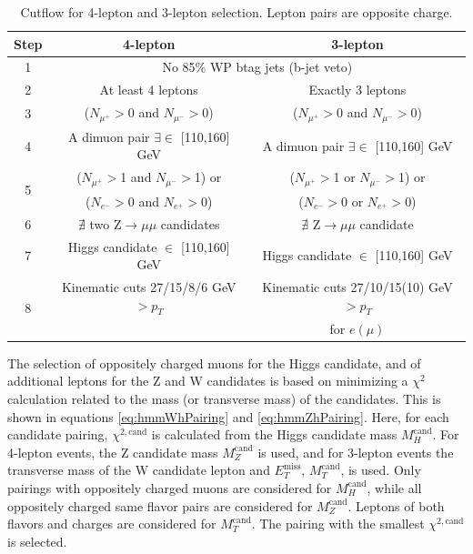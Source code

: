 \begin{table}[ht!]
 \begin{center}
\begin{tabular}{c c  c}\toprule
Step & 4-lepton & 3-lepton \\\midrule
1 & \multicolumn{2}{c}{No 85\% WP btag jets (b-jet veto)}           \\\midrule
2 & At least 4 leptons                                & Exactly 3 leptons\\\midrule
3 & ($N_{\mu^+}>$0 and $N_{\mu^-}>$0)                 & ($N_{\mu^+}>$0 and $N_{\mu^-}>$0) \\\midrule
4 & A dimuon pair $\exists\in$ [110,160] GeV                    & A dimuon pair $\exists\in$ [110,160] GeV \\\midrule
\multirow{2}{*}{5} & ($N_{\mu^+}>$1 and $N_{\mu^-}>$1) or              & ($N_{\mu^+}>$1 or $N_{\mu^-}>$1) or \\
  & ($N_{e^-}>$0 and $N_{e^+}>$0)                    & ($N_{e^-}>$0 or $N_{e^+}>$0)  \\\midrule
6 & $\nexists$ two Z$\to\mu\mu$ candidates                        & $\nexists$ Z$\to\mu\mu$ candidate  \\\midrule
7 & Higgs candidate $\in$ [110,160] GeV                  & Higgs candidate $\in$ [110,160] GeV \\\midrule
\multirow{2}{*}{8} & Kinematic cuts 27/15/8/6 GeV $>p_T$                    & Kinematic cuts 27/10/15(10) GeV $>p_T$ \\
  &                                                        & for $e(\mu)$ \\
\bottomrule\end{tabular}
 \end{center}
 \caption{Cutflow for 4-lepton and 3-lepton selection. Lepton pairs are opposite charge.}
\label{tab:hmmEv}
\end{table}

The selection of oppositely charged muons for the Higgs candidate, and of additional leptons for the Z and W candidates is based on minimizing a $\chi^2$ calculation related to the mass (or transverse mass) of the candidates. This is shown in equations \ref{eq:hmmWhPairing} and \ref{eq:hmmZhPairing}. Here, for each candidate pairing, $\chi^{2,\text{cand}}$ is calculated from the Higgs candidate mass $M_H^\text{cand}$. For 4-lepton events, the Z candidate mass $M_Z^\text{cand}$ is used, and for 3-lepton events the transverse mass of the W candidate lepton and $E_T^\text{miss}$, $M_T^\text{cand}$, is used. Only pairings with oppositely charged muons are considered for $M_H^\text{cand}$, while all oppositely charged same flavor pairs are considered for $M_Z^\text{cand}$. Leptons of both flavors and charges are considered for $M_T^\text{cand}$. The pairing with the smallest $\chi^{2,\text{cand}}$ is selected.

